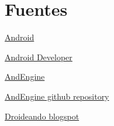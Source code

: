 \documentclass[12 pt, a4paper, twoside]{article}
\begin{document}





\section{Fuentes}
\href{http://www.android.com}{Android}

\href{http://developer.android.com/index.html}{Android Developer}

\href{http://www.andengine.org/}{AndEngine}

\href{https://github.com/nicolasgramlich/AndEngine}{AndEngine github repository}

\href{http://droideando.blogspot.com.es}{Droideando blogspot}
\end{document}
